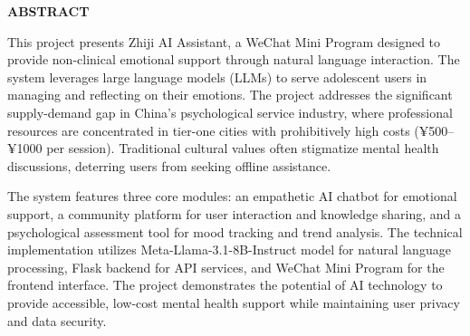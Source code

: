 \begin{center}
    \vspace*{2cm}
    {\Large \textbf{ABSTRACT}}\\[1cm]
\end{center}

This project presents Zhiji AI Assistant, a WeChat Mini Program designed to provide non-clinical emotional support through natural language interaction. The system leverages large language models (LLMs) to serve adolescent users in managing and reflecting on their emotions. The project addresses the significant supply-demand gap in China's psychological service industry, where professional resources are concentrated in tier-one cities with prohibitively high costs (¥500–¥1000 per session). Traditional cultural values often stigmatize mental health discussions, deterring users from seeking offline assistance.

The system features three core modules: an empathetic AI chatbot for emotional support, a community platform for user interaction and knowledge sharing, and a psychological assessment tool for mood tracking and trend analysis. The technical implementation utilizes Meta-Llama-3.1-8B-Instruct model for natural language processing, Flask backend for API services, and WeChat Mini Program for the frontend interface. The project demonstrates the potential of AI technology to provide accessible, low-cost mental health support while maintaining user privacy and data security.

\newpage 